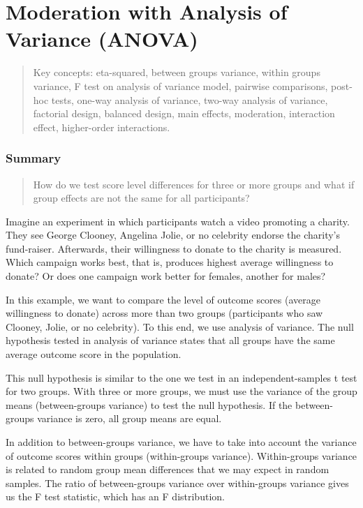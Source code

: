 \documentclass[a4paper]{book}
\theoremstyle{definition}
\theoremstyle{definition}
\theoremstyle{definition}
\theoremstyle{remark}
\begin{document}
\chapter{Moderation with Analysis of Variance (ANOVA)}\label{anova}

\begin{quote}
Key concepts: eta-squared, between groups variance, within groups
variance, F test on analysis of variance model, pairwise comparisons,
post-hoc tests, one-way analysis of variance, two-way analysis of
variance, factorial design, balanced design, main effects, moderation,
interaction effect, higher-order interactions.
\end{quote}

\subsection*{Summary}\label{summary-6}

\begin{quote}
How do we test score level differences for three or more groups and what
if group effects are not the same for all participants?
\end{quote}

Imagine an experiment in which participants watch a video promoting a
charity. They see George Clooney, Angelina Jolie, or no celebrity
endorse the charity's fund-raiser. Afterwards, their willingness to
donate to the charity is measured. Which campaign works best, that is,
produces highest average willingness to donate? Or does one campaign
work better for females, another for males?

In this example, we want to compare the level of outcome scores (average
willingness to donate) across more than two groups (participants who saw
Clooney, Jolie, or no celebrity). To this end, we use analysis of
variance. The null hypothesis tested in analysis of variance states that
all groups have the same average outcome score in the population.

This null hypothesis is similar to the one we test in an
independent-samples t test for two groups. With three or more groups, we
must use the variance of the group means (between-groups variance) to
test the null hypothesis. If the between-groups variance is zero, all
group means are equal.

In addition to between-groups variance, we have to take into account the
variance of outcome scores within groups (within-groups variance).
Within-groups variance is related to random group mean differences that
we may expect in random samples. The ratio of between-groups variance
over within-groups variance gives us the F test statistic, which has an
F distribution.
\end{document}
